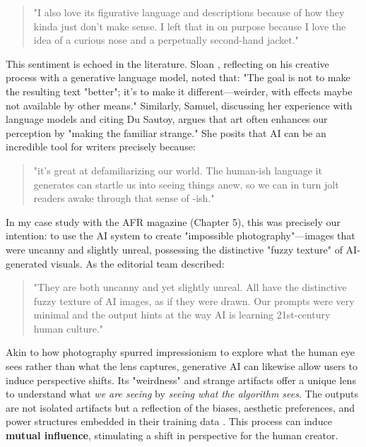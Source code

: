 \begin{quote}
"I also love its figurative language and descriptions because of how they kinda just don't make sense. I left that in on purpose because I love the idea of a curious nose and a perpetually second-hand jacket."
\end{quote}

This sentiment is echoed in the literature. Sloan \cite{Sloan2016-fj}, reflecting on his creative process with a generative language model, noted that: "The goal is not to make the resulting text "better"; it's to make it different—weirder, with effects maybe not available by other means." Similarly, Samuel, discussing her experience with language models and citing Du Sautoy, argues that art often enhances our perception by "making the familiar strange." She posits that AI can be an incredible tool for writers precisely because:

\begin{quote}
"it's great at defamiliarizing our world. The human-ish language it generates can startle us into seeing things anew, so we can in turn jolt readers awake through that sense of -ish."
\end{quote}

In my case study with the AFR magazine (Chapter 5), this was precisely our intention: to use the AI system to create "impossible photography"—images that were uncanny and slightly unreal, possessing the distinctive "fuzzy texture" of AI-generated visuals. As the editorial team described:

\begin{quote}
"They are both uncanny and yet slightly unreal. All have the distinctive fuzzy texture of AI images, as if they were drawn. Our prompts were very minimal and the output hints at the way AI is learning 21st-century human culture."
\end{quote}

Akin to how photography spurred impressionism to explore what the human eye sees rather than what the lens captures, generative AI can likewise allow users to induce perspective shifts. Its "weirdness" and strange artifacts offer a unique lens to understand what \textit{we are seeing} by \textit{seeing what the algorithm sees}. The outputs are not isolated artifacts but a reflection of the biases, aesthetic preferences, and power structures embedded in their training data \cite{Schaerf2024-gf, Cetinic2022-tw, Rodriguez-Ortega2022-ak, Salvaggio2023-cv}. This process can induce \textbf{mutual influence}, stimulating a shift in perspective for the human creator.


